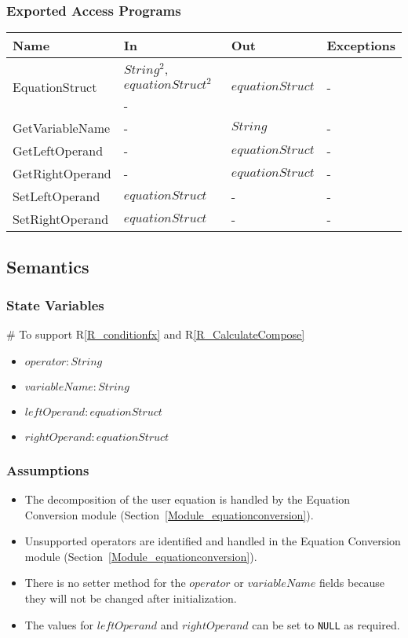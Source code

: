 \documentclass[12pt, titlepage]{article}
\newcommand{\rref}[1]{R\ref{#1}}
\begin{document}
\subsubsection{Exported Access Programs}

\begin{center}
	\begin{tabular}{p{3cm} p{3cm} p{3cm} p{5cm}}
		\hline
		\textbf{Name} & \textbf{In} & \textbf{Out} & \textbf{Exceptions} \\
		\hline
		\multirow{2}{3cm}{EquationStruct} & $String^2$, $equationStruct^2$ & 
		\multirow{2}{3cm}{$equationStruct$} & 
		\multirow{2}{5cm}{-}\\
		GetOperator & - & $String$ & - \\
		GetVariableName & - & $String$ & - \\
		GetLeftOperand & - & $equationStruct$ & -\\
		GetRightOperand & - & $equationStruct$ & - \\
		SetLeftOperand & $equationStruct$ & - & - \\
		SetRightOperand & $equationStruct$ & - & - \\
		\hline
	\end{tabular}
\end{center}

\subsection{Semantics}

\subsubsection{State Variables}

\# To support \rref{R_conditionfx} and \rref{R_CalculateCompose}
\begin{itemize}
	\item $operator : String$
	\item $variableName : String$
	\item $leftOperand : equationStruct$
	\item $rightOperand : equationStruct$
\end{itemize}

\subsubsection{Assumptions}

\begin{itemize}
	\item The decomposition of the user equation is handled by the Equation 
	Conversion module (Section~\ref{Module_equationconversion}).
	\item Unsupported operators are identified and handled in the Equation 
	Conversion module (Section~\ref{Module_equationconversion}).
	\item There is no setter method for the $operator$ or $variableName$ fields 
	because they will not be changed after initialization.
	\item The values for $leftOperand$ and $rightOperand$ can be set to 
	\texttt{NULL} as required.
\end{itemize}
\end{document}
